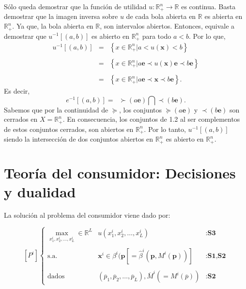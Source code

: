\begin{teo}
	Sólo queda demostrar que la función de utilidad $u:\mathbb{R}_+^n\to \mathbb{R}$ es continua. Basta demostrar que la imagen inversa sobre $u$ de cada bola abierta en $\mathbb{R}$ es abierta en $\mathbb{R}_+^n$. Ya que, la bola abierta en $\mathbb{R}$, son intervalos abiertos. Entonces, equivale a demostrar que $u^{-1}\left[(a,b)\right]$ es abierto en $\mathbb{R}_+^n$ para todo $a<b$. Por lo que,
	$$
	\begin{array}{rcl}
	    u^{-1}\left[(a,b)\right] &=& \left\{x\in \mathbb{R}_+^n | a<u(\textbf{x}) < b\right\}\\\\
				     &=& \left\{x\in \mathbb{R}_+^n | a\textbf{e}\prec u(\textbf{x})\textbf{e} \prec b\textbf{e}\right\}\\\\
				     &=& \left\{x\in \mathbb{R}_+^n | a\textbf{e}\prec \textbf{x} \prec b\textbf{e}\right\}.
	\end{array}
	$$
	Es decir,
	\begin{equation}
	    e^{-1}\left[(a,b)\right]=\;\; \succ (a\textbf{e}) \bigcap \prec (b\textbf{e}).
	\end{equation}
	Sabemos que por la continuidad de $\succeq$, los conjuntos $\succeq (a\textbf{e})$ y $\prec (b\textbf{e})$ son cerrados en $X=\mathbb{R}_+^n$. En consecuencia, los conjuntos de 1.2 al ser complementos de estos conjuntos cerrados, son abiertos en $\mathbb{R}_+^n$. Por lo tanto, $u^{-1}\left[(a,b)\right]$ siendo la intersección de dos conjuntos abiertos en $\mathbb{R}^n_+$ es abierto en $\mathbb{R}_+^n$.
\end{teo}


\chapter{Teoría del consumidor: Decisiones y dualidad}

La solución al problema del consumidor viene dado por:

$$
\left[P^i\right]
\left\{
    \begin{array}{rcl}
	\max_{x_1^i,x_2^i,\ldots,x_L^i}\in \mathbb{R}^L & u\left(x_1^i,x_2^i,\ldots,x_L^i\right) & :\textbf{S3}\\\\
	\text{s.a.} & \textbf{x}^i \in \beta^i(\textbf{p}\left[=\hat{\beta}^i \left(\textbf{p},M^i(\textbf{p})\right)\right] & :\textbf{S1,S2}\\\\
	\text{dados} & \left(\overline{p}_1,\overline{p}_2,\ldots,\overline{p}_L\right), \overline{M}^i \left(=M^i(\overline{p})\right) & :\textbf{S2}
    \end{array}
\right.
$$

